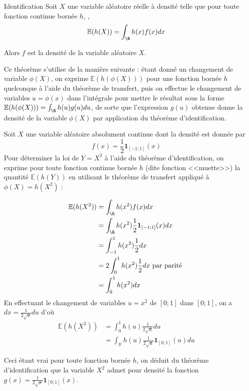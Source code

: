 \begin{theoreme}{Identification}{}
		Soit $X$ une variable aléatoire réelle à densité telle que pour toute fonction continue bornée $h$, , 
		$$\mathbb{E}(h(X))=\int_{\R}^{}h(x)f(x)dx$$
		
		Alors $f$ est la densité de la variable aléatoire $X$.
\end{theoreme}

Ce théorème s'utilise de la manière suivante : étant donné un changement de variable $\phi(X)$, on exprime $\mathbb{E}(h(\phi(X)))$ pour une fonction bornée $h$ quelconque à l'aide du théorème de transfert,  puis on effectue le changement de variables $u=\phi(x)$ dans l'intégrale pour mettre le résultat sous la forme $\mathbb{E}(h(\phi(X))) = \int_{\R}^{}h(u)g(u)du$, de sorte que l'expression $g(u)$ obtenue donne la densité de la variable $\phi(X)$ par application du théorème d'identification.
	
	\begin{exemple}{}{}
Soit $X$ une variable aléatoire absolument continue dont la densité est donnée par $$f(x)=\frac{1}{2}\textbf{1}_{[-1;1]}(x)$$
	Pour déterminer la loi de $Y=X^2$ à l'aide du théorème d'identification, on exprime pour toute fonction continue bornée $h$ (dite fonction <<muette>>) la quantité $\mathbb{E}(h(Y))$ en utilisant le théorème de transfert appliqué à $\phi(X) = h(X^2)$ :
	
\begin{align*}
\mathbb{E}(h(X^2)) &= \int_{\R} h(x^2) f(x) dx \\
&= \int_{\R} h(x^2) \frac{1}{2}\textbf{1}_{[-1;1]}(x) dx \\
&= \int_{-1}^1 h(x^2) \frac{1}{2} dx \\
&= 2\int_0^1 h(x^2) \frac{1}{2} dx \text{ par parité } \\
&= \int_0^1 h(x^2) dx
\end{align*} 
En effectuant le changement de variables $u=x^2$ de $[0;1]$ dans $[0;1]$, on a $dx = \frac{1}{2\sqrt{u}}du$ d'où 
\begin{align*}
\mathbb{E}(h(X^2)) &= \int_0^1 h(u) \frac{1}{2\sqrt{u}}du \\
&= \int_{\mathbb{R}}^{} h(u) \frac{1}{2\sqrt{u}} \textbf{1}_{[0;1]}(u) du
\end{align*}

Ceci étant vrai pour toute fonction bornée $h$, on déduit du théorème d'identification que la variable $X^2$ admet pour densité la fonction $g(x) = \frac{1}{2\sqrt{x}} \textbf{1}_{[0;1]}(x)$. 
	\end{exemple}
	
